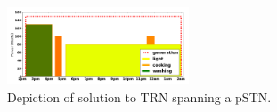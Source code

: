 \begin{figure}[H]
\begin{center}
\includegraphics[width=0.48\textwidth]{pstnu_scheduling}
\caption{Depiction of solution to TRN spanning a pSTN.}
\label{fig:pstnu_scheduling}
\end{center}
\end{figure}
